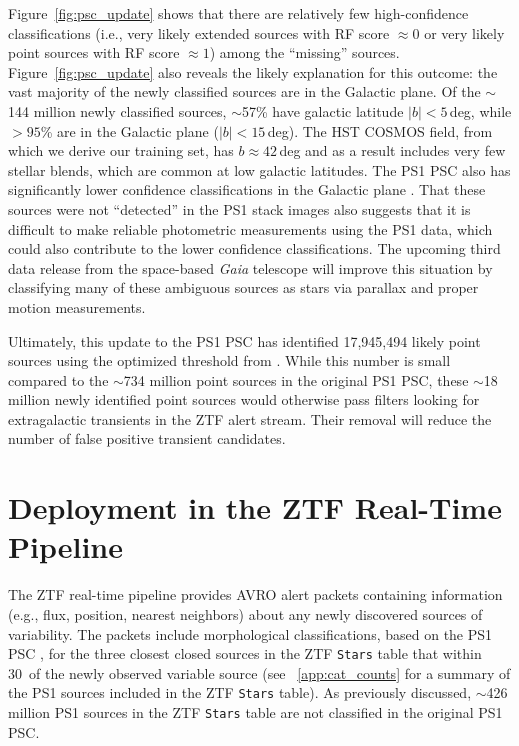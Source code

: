 \documentclass[twocolumn]{aastex63}
\begin{document}
Figure~\ref{fig:psc_update} shows that there are relatively few
high-confidence classifications (i.e., very likely extended sources with RF
score $\approx 0$ or very likely point sources with RF score $\approx 1$)
among the ``missing'' sources. Figure~\ref{fig:psc_update} also reveals the
likely explanation for this outcome: the vast majority of the newly classified
sources are in the Galactic plane. Of the $\sim$144 million newly classified
sources, $\sim$57\% have galactic latitude $\lvert b \rvert < 5$\,deg, while
$> 95$\% are in the Galactic plane ($\lvert b \rvert < 15$\,deg). The HST
COSMOS field, from which we derive our training set, has $b \approx 42$\,deg
and as a result includes very few stellar blends, which are common at low
galactic latitudes. The PS1 PSC also has significantly lower confidence
classifications in the Galactic plane \citep[see Figure~8 in][]{Tachibana18}.
That these sources were not ``detected'' in the PS1 stack images also suggests
that it is difficult to make reliable photometric measurements using the PS1
data, which could also contribute to the lower confidence classifications. The
upcoming third data release from the space-based \textit{Gaia} telescope
\citep{Perryman01} will improve this situation by classifying many of these
ambiguous sources as stars via parallax and proper motion measurements.

Ultimately, this update to the PS1 PSC has identified 17,945,494 likely point
sources using the optimized threshold from \citet[][RF score $\ge
0.83$]{Tachibana18}. While this number is small compared to the $\sim$734
million point sources in the original PS1 PSC, these $\sim$18 million newly
identified point sources would otherwise pass filters looking for
extragalactic transients in the ZTF alert stream. Their removal will reduce
the number of false positive transient candidates.

\section{Deployment in the ZTF Real-Time Pipeline}\label{sec:ztf_pipeline}

The ZTF real-time pipeline \citep{Masci19} provides AVRO alert packets
\citep[see][]{Patterson19} containing information (e.g., flux, position,
nearest neighbors) about any newly discovered sources of variability. The
packets include morphological classifications, based on the PS1 PSC
\citep{Tachibana18}, for the three closest closed sources in the ZTF
\texttt{Stars} table that within 30\arcsec\ of the newly observed variable
source (see ~\ref{app:cat_counts} for a summary of the PS1 sources included in
the ZTF \texttt{Stars} table). As previously discussed, $\sim$426 million PS1
sources in the ZTF \texttt{Stars} table are not classified in the original PS1
PSC.
\end{document}
